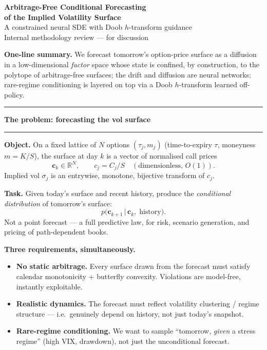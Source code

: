 \documentclass[12pt]{article}
\newcommand{\slide}[1]{%
  \par\noindent\rule{\linewidth}{1.2pt}\par\vspace{2pt}%
  {\LARGE\bfseries #1}\par\vspace{2pt}%
  \noindent\rule{\linewidth}{0.5pt}\par\vspace{8pt}}
\newcommand{\R}{\mathbb{R}}
\begin{document}
\thispagestyle{empty}
\vspace*{0.5in}
\begin{center}
{\huge\bfseries Arbitrage-Free Conditional Forecasting\\[6pt]
of the Implied Volatility Surface}\\[18pt]
{\Large A constrained neural SDE with Doob $h$-transform guidance}\\[28pt]
{\large Internal methodology review --- for discussion}\\[10pt]
\end{center}
\vfill
\begin{center}
\begin{minipage}{0.85\linewidth}
\small
\textbf{One-line summary.} We forecast tomorrow's option-price surface as a
diffusion in a low-dimensional \emph{factor} space whose state is confined,
by construction, to the polytope of arbitrage-free surfaces; the drift and
diffusion are neural networks; rare-regime conditioning is layered on top
via a Doob $h$-transform learned off-policy.
\end{minipage}
\end{center}
\vfill
\clearpage

\slide{The problem: forecasting the vol surface}

\textbf{Object.} On a fixed lattice of $N$ options $(\tau_j, m_j)$
(time-to-expiry $\tau$, moneyness $m=K/S$), the surface at day $k$ is a
vector of normalised call prices
\[
\mathbf c_k \in \R^N, \qquad c_j = C_j / S \quad (\text{dimensionless, } O(1)).
\]
Implied vol $\sigma_j$ is an entrywise, monotone, bijective transform of $c_j$.

\vspace{6pt}
\textbf{Task.} Given today's surface and recent history, produce the
\emph{conditional distribution} of tomorrow's surface:
\[
p\bigl(\mathbf c_{k+1} \,\big|\, \mathbf c_k,\; \text{history}\bigr).
\]
Not a point forecast --- a full predictive law, for risk, scenario
generation, and pricing of path-dependent books.

\vspace{6pt}
\textbf{Three requirements, simultaneously.}
\begin{itemize}
\item[(R1)] \textbf{No static arbitrage.} Every surface drawn from the
  forecast must satisfy calendar monotonicity + butterfly convexity.
  Violations are model-free, instantly exploitable.
\item[(R2)] \textbf{Realistic dynamics.} The forecast must reflect
  volatility clustering / regime structure --- i.e.\ genuinely depend on
  history, not just today's snapshot.
\item[(R3)] \textbf{Rare-regime conditioning.} We want to sample
  ``tomorrow, \emph{given} a stress regime'' (high VIX, drawdown), not just
  the unconditional forecast.
\end{itemize}
\end{document}
